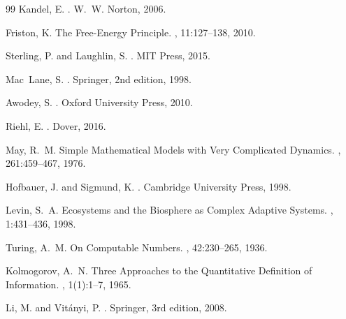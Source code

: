 \documentclass[12pt,twoside,openright]{book}
\begin{document}
\begin{thebibliography}{99}
Kandel, E.
.
\newblock W.~W. Norton, 2006.

Friston, K.
\newblock The Free-Energy Principle.
,
  11:127--138, 2010.

Sterling, P. and Laughlin, S.
.
\newblock MIT Press, 2015.


Mac~Lane, S.
.
\newblock Springer, 2nd edition, 1998.

Awodey, S.
.
\newblock Oxford University Press, 2010.

Riehl, E.
.
\newblock Dover, 2016.


May, R.~M.
\newblock Simple Mathematical Models with Very Complicated Dynamics.
, 261:459--467, 1976.

Hofbauer, J. and Sigmund, K.
.
\newblock Cambridge University Press, 1998.

Levin, S.~A.
\newblock Ecosystems and the Biosphere as Complex Adaptive Systems.
, 1:431--436, 1998.


Turing, A.~M.
\newblock On Computable Numbers.
,
  42:230--265, 1936.

Kolmogorov, A.~N.
\newblock Three Approaches to the Quantitative Definition of Information.
,
  1(1):1--7, 1965.

Li, M. and Vit\'{a}nyi, P.
.
\newblock Springer, 3rd edition, 2008.


\end{thebibliography}
\end{document}
